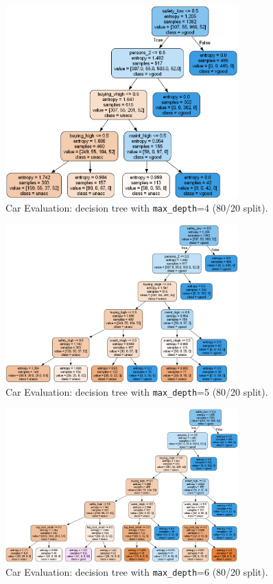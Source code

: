 \begin{figure}[H]
	\centering
	\includegraphics[width=0.8\textwidth]{imgs/dt/dt__car_evaluation__80_vs_20__4.png}
	\caption{Car Evaluation: decision tree with \texttt{max\_depth}=4 (80/20 split).}
	\label{fig:ce-dt-depth-4}
\end{figure}

\begin{figure}[H]
	\centering
	\includegraphics[width=0.8\textwidth]{imgs/dt/dt__car_evaluation__80_vs_20__5.png}
	\caption{Car Evaluation: decision tree with \texttt{max\_depth}=5 (80/20 split).}
	\label{fig:ce-dt-depth-5}
\end{figure}

\begin{figure}[H]
	\centering
	\includegraphics[width=0.8\textwidth]{imgs/dt/dt__car_evaluation__80_vs_20__6.png}
	\caption{Car Evaluation: decision tree with \texttt{max\_depth}=6 (80/20 split).}
	\label{fig:ce-dt-depth-6}
\end{figure}

